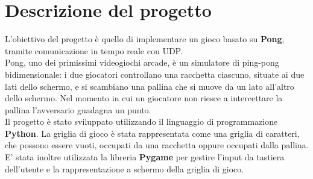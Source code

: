 
\newpage
\thispagestyle{headings}
\section{Descrizione del progetto}\label{sec:Descrizione}
L'obiettivo del progetto è quello di implementare un gioco basato su \textbf{Pong},
tramite comunicazione in tempo reale con UDP. \\
Pong, uno dei primissimi videogiochi arcade, è un simulatore di ping-pong bidimensionale:
i due giocatori controllano una racchetta ciascuno, situate ai due lati dello schermo,
e si scambiano una pallina che si muove da un lato all'altro dello schermo.
Nel momento in cui un giocatore non riesce a intercettare la pallina l'avversario guadagna un punto. \\

Il progetto è stato sviluppato utilizzando il linguaggio di programmazione \textbf{Python}.
La griglia di gioco è stata rappresentata come una griglia di caratteri, che possono essere vuoti,
occupati da una racchetta oppure occupati dalla pallina.
E' stata inoltre utilizzata la libreria \textbf{Pygame} per gestire l'input da tastiera dell'utente
e la rappresentazione a schermo della griglia di gioco.